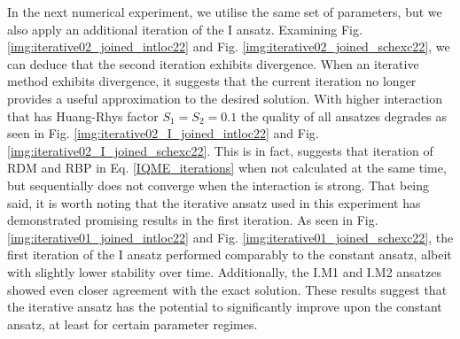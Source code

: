 In the next numerical experiment, we utilise the same set of parameters, but we also apply an additional iteration of the I ansatz. Examining Fig. \ref{img:iterative02_joined_intloc22} and Fig. \ref{img:iterative02_joined_schexc22}, we can deduce that the second iteration exhibits divergence. When an iterative method exhibits divergence, it suggests that the current iteration no longer provides a useful approximation to the desired solution. With higher interaction that has Huang-Rhys factor $S_1=S_2=0.1$ the quality of all ansatzes degrades as seen in Fig. \ref{img:iterative02_I_joined_intloc22} and Fig. \ref{img:iterative02_I_joined_schexc22}. This is in fact, suggests that iteration of RDM and RBP in Eq. \ref{IQME_iterations} when not calculated at the same time, but sequentially does not converge when the interaction is strong. That being said, it is worth noting that the iterative ansatz used in this experiment has demonstrated promising results in the first iteration. As seen in Fig. \ref{img:iterative01_joined_intloc22} and Fig. \ref{img:iterative01_joined_schexc22}, the first iteration of the I ansatz performed comparably to the constant ansatz, albeit with slightly lower stability over time. Additionally, the I.M1 and I.M2 ansatzes showed even closer agreement with the exact solution. These results suggest that the iterative ansatz has the potential to significantly improve upon the constant ansatz, at least for certain parameter regimes.  

